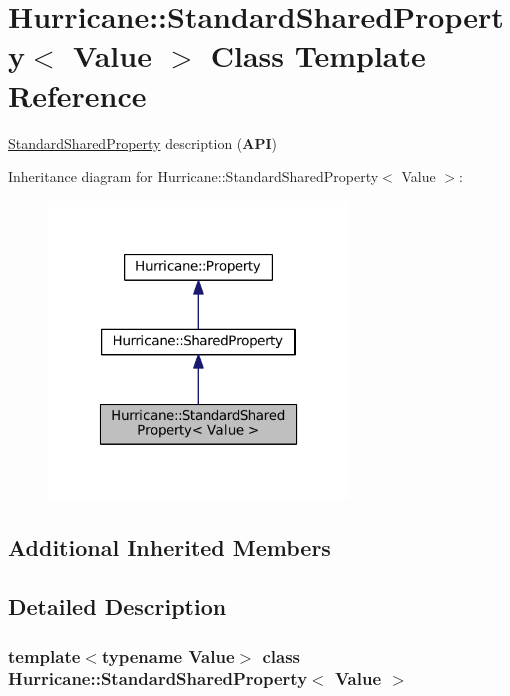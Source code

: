 \hypertarget{classHurricane_1_1StandardSharedProperty}{}\section{Hurricane\+:\+:Standard\+Shared\+Property$<$ Value $>$ Class Template Reference}
\label{classHurricane_1_1StandardSharedProperty}


\mbox{\hyperlink{classHurricane_1_1StandardSharedProperty}{Standard\+Shared\+Property}} description ({\bfseries A\+PI})  




Inheritance diagram for Hurricane\+:\+:Standard\+Shared\+Property$<$ Value $>$\+:\nopagebreak
\begin{figure}[H]
\begin{center}
\leavevmode
\includegraphics[width=226pt]{classHurricane_1_1StandardSharedProperty__inherit__graph}
\end{center}
\end{figure}
\subsection*{Additional Inherited Members}


\subsection{Detailed Description}
\subsubsection*{template$<$typename Value$>$\newline
class Hurricane\+::\+Standard\+Shared\+Property$<$ Value $>$}

